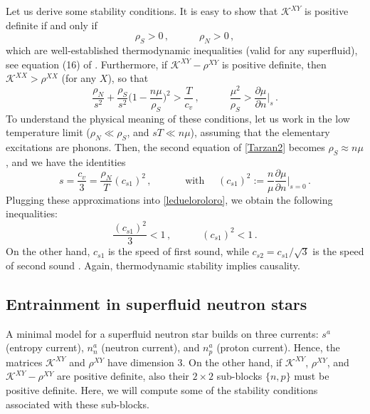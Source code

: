 \documentclass[a4paper, amsfonts, amssymb, amsmath, reprint, showkeys, nofootinbib, twoside, onecolumn,notitlepage]{revtex4-1}
\newcommand{\spc}{\quad \quad \quad}
\theoremstyle{definition}
\theoremstyle{theorem}
\begin{document}
Let us derive some stability conditions. It is easy to show that $\mathcal{K}^{XY}$ is positive definite if and only if
\begin{equation}
\rho_S >0 \, , \spc \rho_N >0 \, ,
\end{equation}
which are well-established thermodynamic inequalities (valid for any superfluid), see equation (16) of \citet{AndreevMelnikovski2004}. Furthermore, if $\mathcal{K}^{XY}-\rho^{XY}$ is positive definite, then $\mathcal{K}^{XX}>\rho^{XX}$ (for any $X$), so that
\begin{equation}\label{ledueloroloro}
\dfrac{\rho_N}{s^2} + \dfrac{\rho_S}{s^2}\bigg(1-\dfrac{n\mu}{\rho_S} \bigg)^2 > \dfrac{T}{c_v} \, , \spc  \dfrac{\mu^2}{\rho_S} > \dfrac{\partial \mu}{\partial n} \bigg|_s \, .
\end{equation}
To understand the physical meaning of these conditions, let us work in the low temperature limit ($\rho_N \ll \rho_S$, and $sT \ll n\mu$), assuming that the elementary excitations are phonons. Then, the second equation of \eqref{Tarzan2} becomes $\rho_S \approx n\mu$, and we have the identities \cite{landau9}
\begin{equation}
s = \dfrac{c_v}{3} = \dfrac{ \rho_N}{T} (c_{s1})^2 \, ,  \spc \text{ with } \quad  (c_{s1} )^2 := \dfrac{n}{\mu}\dfrac{\partial \mu}{\partial n} \bigg|_{s=0} \, . 
\end{equation}
Plugging these approximations into \eqref{ledueloroloro}, we obtain the following inequalities:
\begin{equation}
\dfrac{(c_{s1})^2}{3} <1  \, , \spc (c_{s1})^2<1 \, . 
\end{equation}
On the other hand, $c_{s1}$ is the speed of first sound, while $c_{s2}=c_{s1}/\sqrt{3}$ is the speed of second sound \cite{landau6,cool1995}. Again, thermodynamic stability implies causality.



\subsection{Entrainment in superfluid neutron stars}

A minimal model for a superfluid neutron star builds on three currents: $s^a$ (entropy current), $n_n^a$ (neutron current), and $n_p^a$ (proton current). Hence, the matrices $\mathcal{K}^{XY}$ and $\rho^{XY}$ have dimension 3. On the other hand, if $\mathcal{K}^{XY}$, $\rho^{XY}$, and $\mathcal{K}^{XY}-\rho^{XY}$ are positive definite, also their $2 \times 2$ sub-blocks $\{ n,p \}$ must be positive definite. Here, we will compute some of the stability conditions associated with these sub-blocks.
\end{document}
